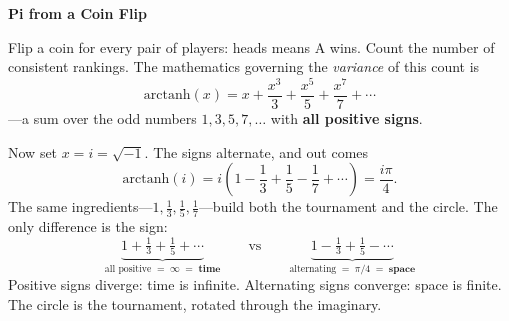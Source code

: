 \documentclass[12pt]{article}
\begin{document}
\begin{center}
{\Large\bfseries Pi from a Coin Flip}
\end{center}

\medskip

Flip a coin for every pair of players: heads means A wins. Count the number of consistent rankings. The mathematics governing the \emph{variance} of this count is
\[
\mathrm{arctanh}(x) = x + \frac{x^3}{3} + \frac{x^5}{5} + \frac{x^7}{7} + \cdots
\]
---a sum over the odd numbers $1, 3, 5, 7, \ldots$ with \textbf{all positive signs}.

Now set $x = i = \sqrt{-1}$. The signs alternate, and out comes
\[
\mathrm{arctanh}(i) = i\!\left(1 - \frac{1}{3} + \frac{1}{5} - \frac{1}{7} + \cdots\right) = \frac{i\pi}{4}.
\]
The same ingredients---$1, \frac{1}{3}, \frac{1}{5}, \frac{1}{7}$---build both the tournament and the circle. The only difference is the sign:
\[
\underbrace{1 + \tfrac{1}{3} + \tfrac{1}{5} + \cdots}_{\text{all positive} \;=\; \infty \;=\; \textbf{time}} \qquad\text{vs}\qquad \underbrace{1 - \tfrac{1}{3} + \tfrac{1}{5} - \cdots}_{\text{alternating} \;=\; \pi/4 \;=\; \textbf{space}}
\]
Positive signs diverge: time is infinite. Alternating signs converge: space is finite. The circle is the tournament, rotated through the imaginary.
\end{document}
